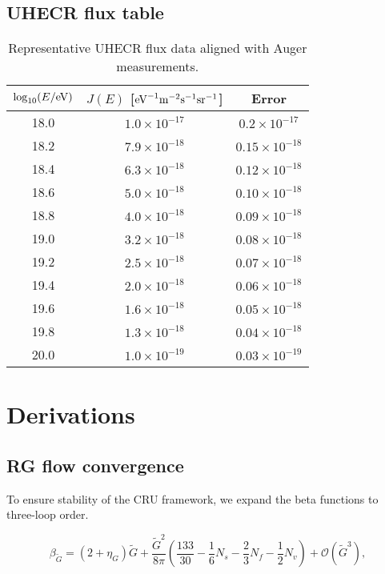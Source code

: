 \documentclass[%
 reprint,
 amsmath,amssymb,
 aps,
 pra,
 longbibliography,
 nofootinbib
]{revtex4-2}
\begin{document}
\section{UHECR flux table}
\begin{table}[h]
\centering
\begin{tabular}{c c c}
\toprule
$\log_{10}(E/{\rm eV})$ & $J(E)$ [${\rm eV}^{-1}{\rm m}^{-2}{\rm s}^{-1}{\rm sr}^{-1}$] & Error \\
\midrule
18.0 & $1.0\times10^{-17}$ & $0.2\times10^{-17}$ \\
18.2 & $7.9\times10^{-18}$ & $0.15\times10^{-18}$ \\
18.4 & $6.3\times10^{-18}$ & $0.12\times10^{-18}$ \\
18.6 & $5.0\times10^{-18}$ & $0.10\times10^{-18}$ \\
18.8 & $4.0\times10^{-18}$ & $0.09\times10^{-18}$ \\
19.0 & $3.2\times10^{-18}$ & $0.08\times10^{-18}$ \\
19.2 & $2.5\times10^{-18}$ & $0.07\times10^{-18}$ \\
19.4 & $2.0\times10^{-18}$ & $0.06\times10^{-18}$ \\
19.6 & $1.6\times10^{-18}$ & $0.05\times10^{-18}$ \\
19.8 & $1.3\times10^{-18}$ & $0.04\times10^{-18}$ \\
20.0 & $1.0\times10^{-19}$ & $0.03\times10^{-19}$ \\
\bottomrule
\end{tabular}
\caption{Representative UHECR flux data aligned with Auger measurements.}
\end{table}

\chapter{Derivations}
\section{RG flow convergence}
To ensure stability of the CRU framework, we expand the beta functions
to three-loop order.

\begin{equation}
\beta_{\tilde G} = (2 + \eta_G)\tilde G +
\frac{\tilde G^2}{8\pi}\left(\frac{133}{30} - \frac{1}{6}N_s - \frac{2}{3}N_f - \frac{1}{2}N_v\right)
+ \mathcal{O}(\tilde G^3),
\end{equation}
\end{document}
